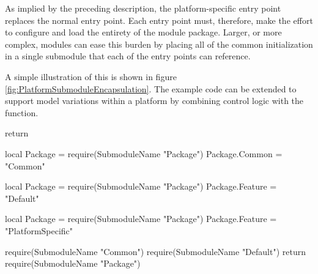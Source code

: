 As implied by the preceding description, the platform-specific entry point
replaces the normal entry point.  Each entry point must, therefore, make the
effort to configure and load the entirety of the module package.  Larger, or
more complex, modules can ease this burden by placing all of the common
initialization in a single submodule that each of the entry points can
reference.

A simple illustration of this is shown in figure
\ref{fig:PlatformSubmoduleEncapsulation}.  The example code can be extended to
support model variations within a platform by combining control logic with the
 function.

\begin{lrbox}{\RightBoxA}
\begin{NestedLuaCode}[linewidth=3.25in]
return {}
\end{NestedLuaCode}
\end{lrbox}

\begin{lrbox}{\RightBoxB}
\begin{NestedLuaCode}[linewidth=3.25in]
local Package = require(SubmoduleName "Package")
Package.Common = "Common"
\end{NestedLuaCode}
\end{lrbox}

\begin{lrbox}{\RightBoxC}
\begin{NestedLuaCode}[linewidth=3.25in]
local Package = require(SubmoduleName "Package")
Package.Feature = "Default"
\end{NestedLuaCode}
\end{lrbox}

\begin{lrbox}{\RightBoxD}
\begin{NestedLuaCode}[linewidth=3.25in]
local Package = require(SubmoduleName "Package")
Package.Feature = "PlatformSpecific"
\end{NestedLuaCode}
\end{lrbox}

\begin{lrbox}{\RightBoxE}
\begin{NestedLuaCode}[linewidth=3.25in]
require(SubmoduleName "Common")
require(SubmoduleName "Default")
return require(SubmoduleName "Package")
\end{NestedLuaCode}
\end{lrbox}


